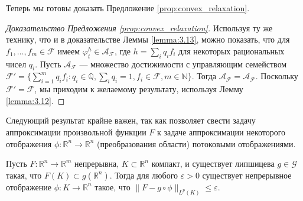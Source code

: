 \documentclass[../NDCNNAI_main.tex]{subfiles}
\begin{document}
Теперь мы готовы доказать Предложение \ref{prop:convex_relaxation}.

\begin{proof}[Доказательство Предложения \ref{prop:convex_relaxation}]
Используя ту же технику, что и в доказательстве Леммы \ref{lemma:3.13}, можно показать, что для \(f_1, \ldots, f_m \in \mathcal{F}\) имеем \(\varphi_{t}^h \in \mathcal{A}_{\mathcal{F}}\), где \(h = \sum_i q_i f_i\) для некоторых рациональных чисел \(q_i\). Пусть \(\mathcal{A}_{\mathcal{F}}\) --- множество достижимости с управляющим семейством \(\mathcal{F}' = \{\sum_{i=1}^{m} q_i f_i : q_i \in \mathbb{Q}, \sum_i q_i = 1, f_i \in \mathcal{F}, m \in \mathbb{N}\}\). Тогда \(\mathcal{A}_{\mathcal{F}} = \mathcal{A}_{\mathcal{F}}\). Поскольку \(\mathcal{F}' = \mathcal{F}\), мы приходим к желаемому результату, используя Лемму \ref{lemma:3.12}.
\end{proof}

Следующий результат крайне важен, так как позволяет свести задачу аппроксимации произвольной функции $F$ к задаче аппроксимации некоторого отображения $\phi: \mathbb{R}^n \to \mathbb{R}^n$ (преобразования области) потоковыми отображениями.

\begin{proposition}
\label{prop:reduction}
Пусть $F: \mathbb{R}^n \to \mathbb{R}^m$ непрерывна, $K \subset \mathbb{R}^n$ компакт, и существует липшицева $g \in \mathcal{G}$ такая, что $F(K) \subset g(\mathbb{R}^n)$. Тогда для любого $\varepsilon > 0$ существует непрерывное отображение $\phi: K \to \mathbb{R}^n$ такое, что $\| F - g \circ \phi \|_{L^p(K)} \leq \varepsilon$.
\end{proposition}
\end{document}
